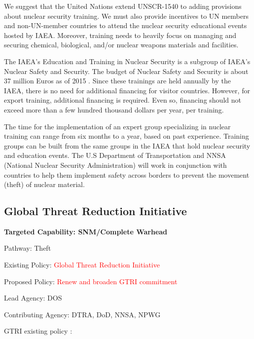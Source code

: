 \documentclass{report}
\begin{document}
We suggest that the United Nations  extend UNSCR-1540 to adding provisions about nuclear security training. We must also provide incentives to UN members and non-UN-member countries to attend the nuclear security educational events hosted by IAEA. Moreover, training needs to heavily focus on managing and securing  chemical, biological, and/or nuclear weapons materials and facilities. 


The IAEA's Education and Training in Nuclear Security is a subgroup of IAEA's Nuclear Safety and Security. The budget of  Nuclear Safety and Security is about 37 million Euros  as of 2015 \cite{Iaea2014}. Since these trainings are held annually by the IAEA, there is no need for additional financing for visitor countries. However, for export training, additional financing is required. Even so, financing should not exceed more than a few hundred thousand dollars per year, per training. 

The time for the implementation of an  expert group specializing in nuclear training can range from six months to a year, based on past experience.  Training groups can be built from the same groups in the IAEA that hold nuclear security and education events. The U.S Department of Transportation and NNSA (National Nuclear Security Administration) will work in conjunction with countries to help them implement safety across borders to prevent the movement (theft) of nuclear material. 




\subsection{Global Threat Reduction Initiative} \label{sec:GTRI}



\bfseries Targeted Capability: SNM/Complete Warhead

Pathway: Theft

Existing Policy:  \textcolor{red}{Global Threat Reduction Initiative}

Proposed Policy:  \textcolor{red}{Renew and broaden GTRI commitment}

Lead Agency: DOS


Contributing Agency: DTRA, DoD, NNSA, NPWG  \normalfont



GTRI existing policy :
\end{document}
